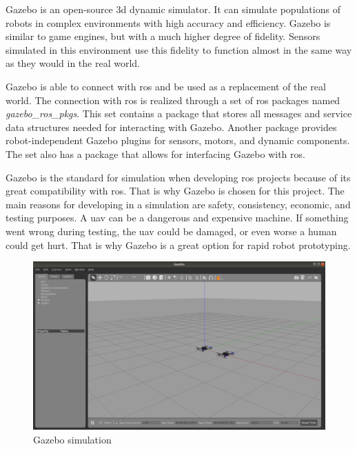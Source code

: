 Gazebo is an open-source \acs{3d} dynamic simulator. It can simulate populations of robots in complex environments with high accuracy and efficiency. Gazebo is similar to game engines, but with a much higher degree of fidelity. Sensors simulated in this environment use this fidelity to function almost in the same way as they would in the real world. \cite{gazebo_beginner_overview} \cite{ackerman2016gazebo}

Gazebo is able to connect with \acs{ros} and be used as a replacement of the real world. The connection with \acs{ros} is realized through a set of \acs{ros} packages named \textit{gazebo\_ros\_pkgs}.
This set contains a package that stores all messages and service data structures needed for interacting with Gazebo. Another package provides robot\hyp{}independent Gazebo plugins for sensors, motors, and dynamic components. The set also has a package that allows for interfacing Gazebo with \acs{ros}. \cite{gazebo_ros_overview} \cite{gazebo_ros_control}

Gazebo is the standard for simulation when developing \acs{ros} projects because of its great compatibility with \acs{ros}. That is why Gazebo is chosen for this project. The main reasons for developing in a simulation are safety, consistency, economic, and testing purposes. A \acs{uav} can be a dangerous and expensive machine. If something went wrong during testing, the \acs{uav} could be damaged, or even worse a human could get hurt. That is why Gazebo is a great option for rapid robot prototyping.

\begin{figure}[!h]
  \centering
    \includegraphics[width=\linewidth]{images/gazebo.png}
  \caption{Gazebo simulation}
\end{figure}